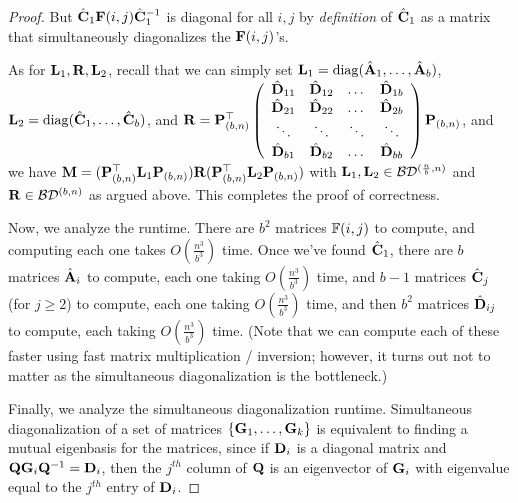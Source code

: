 \begin{proof}
But $\hat{\mathbf{C}}_1 \mathbf{F}(i, j) \hat{\mathbf{C}}_1^{-1}$ is diagonal for all $i,j$ by \emph{definition} of $\hat{\mathbf{C}}_1$ as a matrix that simultaneously diagonalizes the $\mathbf{F}(i,j)$'s.

As for $\mathbf{L}_1,\mathbf{R},\mathbf{L}_2$, recall that we can simply set $\mathbf{L}_1 = \mathrm{diag}(\hat{\mathbf{A}}_1, \dots, \hat{\mathbf{A}}_b)$, $\mathbf{L}_2 = \mathrm{diag}(\hat{\mathbf{C}}_1, \dots, \hat{\mathbf{C}}_b)$, and $\mathbf{R} = \mathbf{P}_{(b,n)}^\top \left( \begin{array}{cccc} \hat{\mathbf{D}}_{11} & \hat{\mathbf{D}}_{12} & \dots & \hat{\mathbf{D}}_{1b} \\ \hat{\mathbf{D}}_{21} & \hat{\mathbf{D}}_{22} & \dots & \hat{\mathbf{D}}_{2b} \\ \ddots & \ddots & \ddots & \ddots  \\ \hat{\mathbf{D}}_{b1} & \hat{\mathbf{D}}_{b2} & \dots & \hat{\mathbf{D}}_{bb} \end{array}\right)
\mathbf{P}_{(b,n)}$, and we have $\mathbf{M} = (\mathbf{P}_{(b,n)}^\top \mathbf{L}_1 \mathbf{P}_{(b,n)}) \mathbf{R} (\mathbf{P}_{(b,n)}^\top\mathbf{L}_2\mathbf{P}_{(b,n)})$ with $\mathbf{L}_1, \mathbf{L}_2 \in \mathcal{B}\mathcal{D}^{(\frac{n}{b}, n)}$ and $\mathbf{R} \in \mathcal{B}\mathcal{D}^{(b,n)}$ as argued above. This completes the proof of correctness.


Now, we analyze the runtime. There are $b^2$ matrices $\mathbb{F}(i,j)$ to compute, and computing each one takes $O(\frac{n^3}{b^3})$ time. Once we've found $\hat{\mathbf{C}}_1$, there are $b$ matrices $\hat{\mathbf{A}}_i$ to compute, each one taking $O(\frac{n^3}{b^3})$ time, and $b-1$ matrices $\hat{\mathbf{C}}_j$ (for $j \ge 2$) to compute, each one taking $O(\frac{n^3}{b^3})$ time, and then $b^2$ matrices $\hat{\mathbf{D}}_{ij}$ to compute, each taking $O(\frac{n^3}{b^3})$ time. (Note that we can compute each of these faster using fast matrix multiplication / inversion; however, it turns out not to matter as the simultaneous diagonalization is the bottleneck.)

Finally, we analyze the simultaneous diagonalization runtime. Simultaneous diagonalization of a set of matrices $\{\mathbf{G}_1, \dots, \mathbf{G}_k\}$ is equivalent to finding a mutual eigenbasis for the matrices, since if $\mathbf{D}_i$ is a diagonal matrix and $\mathbf{Q} \mathbf{G}_i \mathbf{Q}^{-1} = \mathbf{D}_i$, then the $j^{th}$ column of $\mathbf{Q}$ is an eigenvector of $\mathbf{G}_i$ with eigenvalue equal to the $j^{th}$ entry of $\mathbf{D}_i$.


\end{proof}

